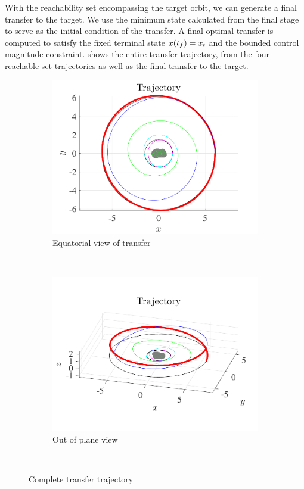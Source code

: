 With the reachability set encompassing the target orbit, we can generate a final transfer to the target.
We use the minimum state calculated from the final stage to serve as the initial condition of the transfer.
A final optimal transfer is computed to satisfy the fixed terminal state \( x(t_f) = x_t \) and the bounded control magnitude constraint.
 shows the entire transfer trajectory, from the four reachable set trajectories as well as the final transfer to the target.
\begin{figure}[htbp] 
    \centering 
    \begin{subfigure}[htbp]{0.45\textwidth} 
        \includegraphics[width=\textwidth]{figures/2016_AAS/trajectory.pdf} 
        \caption{Equatorial view of transfer} \label{fig:trajectory_up} 
    \end{subfigure}~
    \begin{subfigure}[htbp]{0.45\textwidth} 
        \includegraphics[width=\textwidth]{figures/2016_AAS/trajectory_3d.pdf} 
        \caption{Out of plane view} \label{fig:trajectory_3d} 
    \end{subfigure}~ 
    \caption{Complete transfer trajectory}
    \label{fig:trajectory} 
\end{figure}
